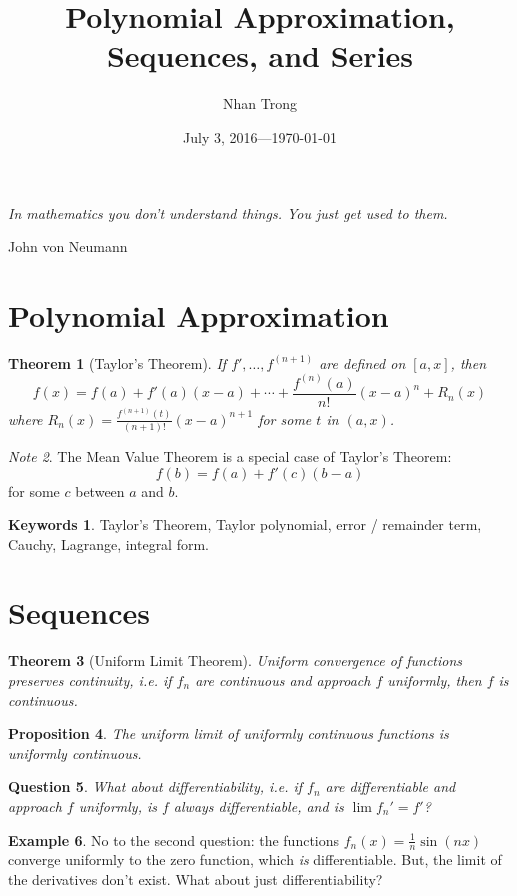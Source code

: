 \documentclass[12pt]{article}
\title{Polynomial Approximation, Sequences, and Series}
\author{Nhan Trong}
\date{July 3, 2016---\today}                                           %
\theoremstyle{plain}
\newtheorem{theorem}{Theorem}
\newtheorem{proposition}[theorem]{Proposition}
\newtheorem{question}[theorem]{Question}
\theoremstyle{definition}
\newtheorem{example}[theorem]{Example}
\newtheorem{keywords}{Keywords}
\theoremstyle{remark}
\newtheorem{note}[theorem]{Note}
\begin{document}
\sloppy
\maketitle

\epigraph{\textit{In mathematics you don't understand things. You just get used to them.}}{John von Neumann}

\part{Polynomial Approximation}

\begin{theorem}[Taylor's Theorem]
If $f', \ldots, f^{(n+1)}$ are defined on $[a, x]$, then 
$$f(x) = f(a) + f'(a)(x - a) + \cdots + \frac{f^{(n)}(a)}{n!}(x - a)^n + R_n(x)$$
where $R_n(x) = \frac{f^{(n+1)}(t)}{(n+1)!}(x - a)^{n+1}$ for some $t$ in $(a, x)$.
\end{theorem}

\begin{note}
The Mean Value Theorem is a special case of Taylor's Theorem:
$$f(b) = f(a) + f'(c)(b - a)$$
for some $c$ between $a$ and $b$.
\end{note}

\begin{keywords}
Taylor's Theorem, Taylor polynomial, error / remainder term, Cauchy, Lagrange, integral form.
\end{keywords}

\part{Sequences}

\begin{theorem}[Uniform Limit Theorem]
Uniform convergence of functions preserves continuity, i.e. if $f_n$ are continuous and approach $f$ uniformly, then $f$ is continuous.
\end{theorem}

\begin{proposition}
The uniform limit of uniformly continuous functions is uniformly continuous.
\end{proposition}

\begin{question}
What about differentiability, i.e. if $f_n$ are differentiable and approach $f$ uniformly, is $f$ always differentiable, and is $\lim f_n' = f'$? 
\end{question}

\begin{example}
No to the second question: the functions $f_n(x) = \frac{1}{n} \sin(nx)$ converge uniformly to the zero function, which \textit{is} differentiable. But, the limit of the derivatives don't exist. What about just differentiability? 
\end{example}
\end{document}

